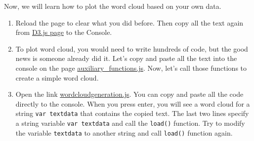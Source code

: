 \documentclass[a4paper, 11pt]{article}
\begin{document}
Now, we will learn how to plot the word cloud based on your own data.
\begin{enumerate}
\item Reload the page to clear what you did before. Then copy all the text again from \href{https://raw.githubusercontent.com/mbostock/d3/master/d3.min.js}{D3.js page} to the Console.
\item To plot word cloud, you would need to write hundreds of code, but the good news is someone already did it. Let's copy and paste all the text into the console on the page \href{http://nymph332088.github.io/CIS4340/labassignments/Lab5/auxiliary_functions.js}{auxiliary\_functions.js}. Now, let's call those functions to create a simple word cloud. 
\item Open the link \href{http://nymph332088.github.io/CIS4340/labassignments/Lab5/wordcloudgeneration.js}{wordcloudgeneration.js}. You can copy and paste all the code directly to the console. When you press enter, you will see a word cloud for a string \texttt{var textdata} that contains the copied text. The last two lines specify a string variable \texttt{var textdata} and call the \texttt{load()} function. Try to modify the variable \texttt{textdata} to another string and call \texttt{load()} function again. 
\end{enumerate}
\end{document}
